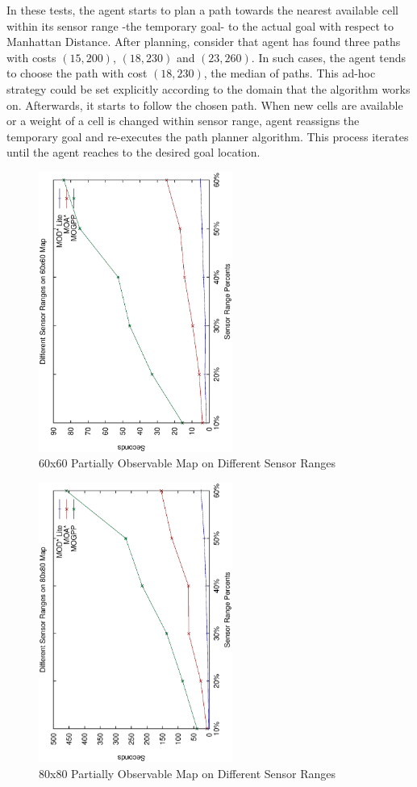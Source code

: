 \documentclass[10pt,journal]{IEEEtran}
\begin{document}
In these tests, the agent starts to plan a path towards the nearest available cell within its sensor range -the temporary goal- to the actual goal with respect to Manhattan Distance. After planning, consider that agent has found three paths with costs $(15, 200)$, $(18, 230)$ and $(23, 260)$. In such cases, the agent tends to choose the path with cost $(18, 230)$, the median of paths. This ad-hoc strategy could be set explicitly according to the domain that the algorithm works on. Afterwards, it starts to follow the chosen path. When new cells are available or a weight of a cell is changed within sensor range, agent reassigns the temporary goal and re-executes the path planner algorithm. This process iterates until the agent reaches to the desired goal location.

\begin{figure}
\centering
\includegraphics[width=2.5in, angle=270]{experimental/60x60_partially_normal}
\caption{60x60 Partially Observable Map on Different Sensor Ranges}
\label{fig:60x60sensor}
\end{figure}

\begin{figure}
\centering
\includegraphics[width=2.5in, angle=270]{experimental/80x80_partially_normal}
\caption{80x80 Partially Observable Map on Different Sensor Ranges}
\label{fig:80x80sensor}
\end{figure}
\end{document}
